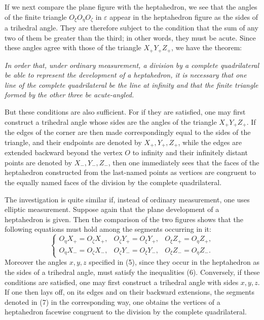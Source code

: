 \documentclass[11pt,a4paper]{article}
\begin{document}
If we next compare the plane figure with the heptahedron, we see that the angles of the finite triangle $O_\xi O_\eta O_\zeta$ in $\varepsilon$ appear in the heptahedron figure as the sides of a trihedral angle. They are therefore subject to the condition that the sum of any two of them be greater than the third; in other words, they must be acute. Since these angles agree with those of the triangle $X_+Y_+Z_+$, we have the theorem:

\emph{In order that, under ordinary measurement, a division by a complete quadrilateral be able to represent the development of a heptahedron, it is necessary that one line of the complete quadrilateral be the line at infinity and that the finite triangle formed by the other three be acute-angled.}

But these conditions are also sufficient. For if they are satisfied, one may first construct a trihedral angle whose sides are the angles of the triangle $X_+Y_+Z_+$. If the edges of the corner are then made correspondingly equal to the sides of the triangle, and their endpoints are denoted by $X_+,Y_+,Z_+$, while the edges are extended backward beyond the vertex $O$ to infinity and their infinitely distant points are denoted by $X_-,Y_-,Z_-$, then one immediately sees that the faces of the heptahedron constructed from the last-named points as vertices are congruent to the equally named faces of the division by the complete quadrilateral.

The investigation is quite similar if, instead of ordinary measurement, one uses elliptic measurement. Suppose again that the plane development of a heptahedron is given. Then the comparison of the two figures shows that the following equations must hold among the segments occurring in it:
\[
\left\{
\begin{array}{lll}
 O_\eta X_+=O_\zeta X_+, & O_\zeta Y_+=O_\xi Y_+, & O_\xi Z_+=O_\eta Z_+,\\
 O_\eta X_-=O_\zeta X_-, & O_\zeta Y_-=O_\xi Y_-, & O_\xi Z_-=O_\eta Z_-.
\end{array}
\right.\tag{7}
\]
Moreover the angles $x,y,z$ specified in (5), since they occur in the heptahedron as the sides of a trihedral angle, must satisfy the inequalities (6). Conversely, if these conditions are satisfied, one may first construct a trihedral angle with sides $x,y,z$. If one then lays off, on its edges and on their backward extensions, the segments denoted in (7) in the corresponding way, one obtains the vertices of a heptahedron facewise congruent to the division by the complete quadrilateral.
\end{document}
